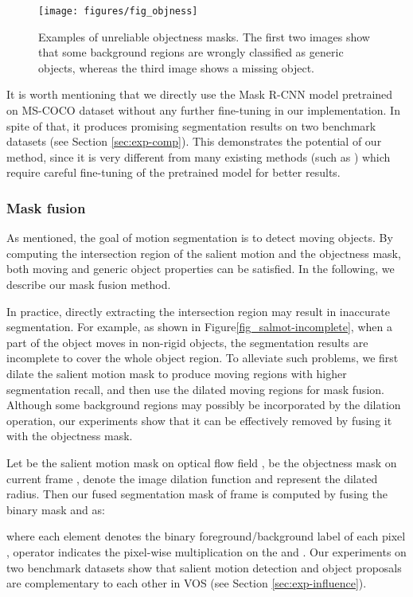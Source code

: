 \documentclass[journal]{IEEEtran}
\makeatletter
\newcommand{\fig}{{Figure}\@\xspace}
\makeatother
\begin{document}
\begin{figure}[!t]
	\centerline{\texttt{[image: figures/fig\_objness]}}
	\caption{Examples of unreliable objectness masks. 
		The first two images show that some background regions are wrongly classified as generic objects, 
		whereas the third image shows a missing object.}
	\label{fig_objness}
\end{figure} 
It is worth mentioning that we directly use the Mask R-CNN model pretrained on MS-COCO dataset \cite{ECCV2014_Lin} without any further fine-tuning in our implementation.
In spite of that, it produces promising segmentation results on two benchmark datasets (see Section \ref{sec:exp-comp}). This demonstrates the potential of our method, since it is very different from many existing methods (such as \cite{CVPR2017_Khoreva,BMVC2017_Voigtlaender}) which require careful fine-tuning of the pretrained model for better results.
    
\subsubsection{Mask fusion}
As mentioned, the goal of motion segmentation is to detect moving objects. By computing the intersection region of the salient motion and the objectness mask, both moving and generic object properties can be satisfied. In the following, we describe our mask fusion method. 

In practice, directly extracting the intersection region may result in inaccurate segmentation. 
For example, as shown in \fig \ref{fig_salmot-incomplete}, 
when a part of the object moves in non-rigid objects, the segmentation results are incomplete to cover the whole object region.
To alleviate such problems, we first dilate the salient motion mask to produce moving regions with higher segmentation recall,
and then use the dilated moving regions for mask fusion.
Although some background regions may possibly be incorporated by the dilation operation,
our experiments show that it can be effectively removed by fusing it with the objectness mask.

Let {\small } be the salient motion mask on optical flow field {\small }, 
{\small } be the objectness mask on current frame {\small },
{\small } denote the image dilation function and  represent the dilated radius. 
Then our fused segmentation mask {\small } of frame {\small } is computed by fusing the binary mask {\small } and {\small } as:

where each element {\small } denotes the binary foreground/background label of each pixel {\small },
operator  indicates the pixel-wise multiplication on the {\small } and {\small }.  
Our experiments on two benchmark datasets show that salient motion detection and object proposals are complementary to each other in VOS (see Section \ref{sec:exp-influence}).  
  
\end{document}
